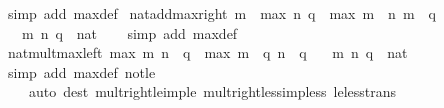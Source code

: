 \begin{isabellebody}
\isamarkupfalse%
\ {\isacharparenleft}{\kern0pt}simp\ add{\isacharcolon}{\kern0pt}\ max{\isacharunderscore}{\kern0pt}def{\isacharparenright}{\kern0pt}%
\endisatagproof
{\isafoldproof}%
%
\isadelimproof
\isanewline
%
\endisadelimproof
\isanewline
{}\isamarkupfalse%
\ nat{\isacharunderscore}{\kern0pt}add{\isacharunderscore}{\kern0pt}max{\isacharunderscore}{\kern0pt}right{\isacharcolon}{\kern0pt}\ {\isachardoublequoteopen}m\ {\isacharplus}{\kern0pt}\ max\ n\ q\ {\isacharequal}{\kern0pt}\ max\ {\isacharparenleft}{\kern0pt}m\ {\isacharplus}{\kern0pt}\ n{\isacharparenright}{\kern0pt}\ {\isacharparenleft}{\kern0pt}m\ {\isacharplus}{\kern0pt}\ q{\isacharparenright}{\kern0pt}{\isachardoublequoteclose}\isanewline
\ \ \ m\ n\ q\ {\isacharcolon}{\kern0pt}{\isacharcolon}{\kern0pt}\ nat\isanewline
%
\isadelimproof
\ \ %
\endisadelimproof
%
\isatagproof
{}\isamarkupfalse%
\ {\isacharparenleft}{\kern0pt}simp\ add{\isacharcolon}{\kern0pt}\ max{\isacharunderscore}{\kern0pt}def{\isacharparenright}{\kern0pt}%
\endisatagproof
{\isafoldproof}%
%
\isadelimproof
\isanewline
%
\endisadelimproof
\isanewline
{}\isamarkupfalse%
\ nat{\isacharunderscore}{\kern0pt}mult{\isacharunderscore}{\kern0pt}max{\isacharunderscore}{\kern0pt}left{\isacharcolon}{\kern0pt}\ {\isachardoublequoteopen}max\ m\ n\ {\isacharasterisk}{\kern0pt}\ q\ {\isacharequal}{\kern0pt}\ max\ {\isacharparenleft}{\kern0pt}m\ {\isacharasterisk}{\kern0pt}\ q{\isacharparenright}{\kern0pt}\ {\isacharparenleft}{\kern0pt}n\ {\isacharasterisk}{\kern0pt}\ q{\isacharparenright}{\kern0pt}{\isachardoublequoteclose}\isanewline
\ \ \ m\ n\ q\ {\isacharcolon}{\kern0pt}{\isacharcolon}{\kern0pt}\ nat\isanewline
%
\isadelimproof
\ \ %
\endisadelimproof
%
\isatagproof
{}\isamarkupfalse%
\ {\isacharparenleft}{\kern0pt}simp\ add{\isacharcolon}{\kern0pt}\ max{\isacharunderscore}{\kern0pt}def\ not{\isacharunderscore}{\kern0pt}le{\isacharparenright}{\kern0pt}\isanewline
\ \ \ \ {\isacharparenleft}{\kern0pt}auto\ dest{\isacharcolon}{\kern0pt}\ mult{\isacharunderscore}{\kern0pt}right{\isacharunderscore}{\kern0pt}le{\isacharunderscore}{\kern0pt}imp{\isacharunderscore}{\kern0pt}le\ mult{\isacharunderscore}{\kern0pt}right{\isacharunderscore}{\kern0pt}less{\isacharunderscore}{\kern0pt}imp{\isacharunderscore}{\kern0pt}less\ le{\isacharunderscore}{\kern0pt}less{\isacharunderscore}{\kern0pt}trans{\isacharparenright}{\kern0pt}%
\endisatagproof
{\isafoldproof}%
%
\isadelimproof
\isanewline
%
\endisadelimproof
\isanewline
{}\isamarkupfalse%

\end{isabellebody}
